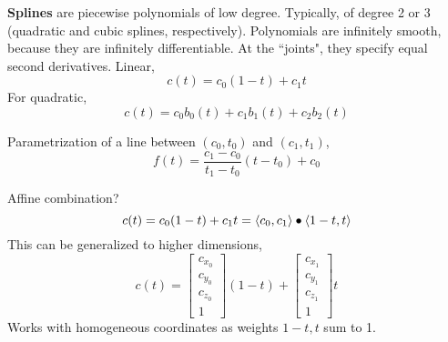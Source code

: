 \documentclass[letterpaper,12pt]{article}
\begin{document}
\textbf{Splines} are piecewise polynomials of low degree. Typically, of degree 2 or 3 (quadratic and cubic splines, respectively). Polynomials are infinitely smooth, because they are infinitely differentiable. At the ``joints", they specify equal second derivatives. Linear,
\begin{equation*}
    c(t) = c_0 (1 - t) + c_1 t
\end{equation*}
For quadratic,
\begin{equation*}
    c(t) = c_0 b_0(t) + c_1 b_1(t) + c_2 b_2(t)
\end{equation*}

Parametrization of a line between $(c_0,t_0)$ and $(c_1,t_1)$,
\begin{equation*}
    f(t) = \frac{c_1 - c_0}{t_1 - t_0} (t - t_0) + c_0
\end{equation*}

Affine combination?
\begin{equation*}
    c(t) = c_0(1 - t) + c_1 t = \left< c_0, c_1 \right> \bullet \left< 1-t, t \right>
\end{equation*}
This can be generalized to higher dimensions,
\begin{equation*}
    c(t) = \begin{bmatrix} c_{x_0} \\ c_{y_0} \\ c_{z_0} \\ 1 \end{bmatrix} (1 - t) + \begin{bmatrix} c_{x_1} \\ c_{y_1} \\ c_{z_1} \\ 1 \end{bmatrix} t
\end{equation*}
Works with homogeneous coordinates as weights $1-t, t$ sum to 1.
\end{document}
